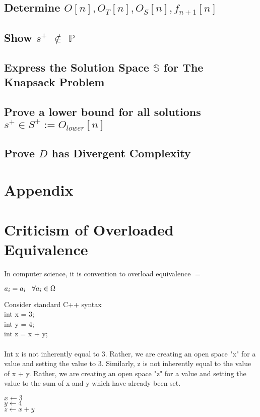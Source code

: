 \documentclass[11pt]{article}
\begin{document}
\subsection{Determine $O[n],O_T[n],O_S[n],f_{n+1}[n]$}
\subsection{Show $s^+$ $\notin$ $\mathbb{P}$}
\subsection{Express the Solution Space $\mathbb{S}$ for The Knapsack Problem}
\subsection{Prove a lower bound for all solutions $s^+ \in S^+ := O_{lower}[n]$}
\subsection{Prove $D$ has Divergent Complexity}




\newpage
\section*{Appendix}



\section{Criticism of Overloaded Equivalence}
In computer science, it is convention to overload equivalence $=$
\begin{center}
$
a_i = a_i \hspace{3mm} \forall a_i \in \Omega
$
\end{center}
\vspace{3mm}
Consider standard C++ syntax\\
int x = 3;\\
int y = 4;\\
int z = x + y;\\ \\
Int x is not inherently equal to 3. Rather, we are creating an open space "x" for a value and setting the value to 3. Similarly, z is not inherently equal
to the value of x + y. Rather, we are creating an open space "z" for a value and setting the value to the sum of x and y which have already been set.
\begin{center}
$
x \leftarrow 3
$
\\ \vspace{2mm}
$
y \leftarrow 4
$
\\ \vspace{2mm}
$
z \leftarrow x + y
$
\end{center}
\end{document}
